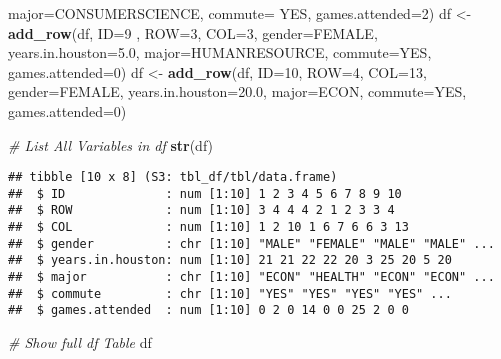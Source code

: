 \documentclass[
]{book}
\newenvironment{Shaded}{\begin{snugshade}}{\end{snugshade}}
\newcommand{\CommentTok}[1]{\textcolor[rgb]{0.56,0.35,0.01}{\textit{#1}}}
\newcommand{\DataTypeTok}[1]{\textcolor[rgb]{0.13,0.29,0.53}{#1}}
\newcommand{\DecValTok}[1]{\textcolor[rgb]{0.00,0.00,0.81}{#1}}
\newcommand{\FloatTok}[1]{\textcolor[rgb]{0.00,0.00,0.81}{#1}}
\newcommand{\KeywordTok}[1]{\textcolor[rgb]{0.13,0.29,0.53}{\textbf{#1}}}
\newcommand{\NormalTok}[1]{#1}
\newcommand{\StringTok}[1]{\textcolor[rgb]{0.31,0.60,0.02}{#1}}
\begin{document}
\begin{Shaded}
\begin{Highlighting}[]
              \DataTypeTok{major=}\StringTok{\textquotesingle{}CONSUMERSCIENCE\textquotesingle{}}\NormalTok{, }\DataTypeTok{commute=} \StringTok{\textquotesingle{}YES\textquotesingle{}}\NormalTok{, }\DataTypeTok{games.attended=}\DecValTok{2}\NormalTok{)}
\NormalTok{df \textless{}{-}}\StringTok{ }\KeywordTok{add\_row}\NormalTok{(df, }\DataTypeTok{ID=}\DecValTok{9}\NormalTok{ , }\DataTypeTok{ROW=}\DecValTok{3}\NormalTok{, }\DataTypeTok{COL=}\DecValTok{3}\NormalTok{,  }\DataTypeTok{gender=}\StringTok{\textquotesingle{}FEMALE\textquotesingle{}}\NormalTok{, }\DataTypeTok{years.in.houston=}\FloatTok{5.0}\NormalTok{,}
              \DataTypeTok{major=}\StringTok{\textquotesingle{}HUMANRESOURCE\textquotesingle{}}\NormalTok{, }\DataTypeTok{commute=}\StringTok{\textquotesingle{}YES\textquotesingle{}}\NormalTok{, }\DataTypeTok{games.attended=}\DecValTok{0}\NormalTok{)}
\NormalTok{df \textless{}{-}}\StringTok{ }\KeywordTok{add\_row}\NormalTok{(df, }\DataTypeTok{ID=}\DecValTok{10}\NormalTok{, }\DataTypeTok{ROW=}\DecValTok{4}\NormalTok{, }\DataTypeTok{COL=}\DecValTok{13}\NormalTok{, }\DataTypeTok{gender=}\StringTok{\textquotesingle{}FEMALE\textquotesingle{}}\NormalTok{, }\DataTypeTok{years.in.houston=}\FloatTok{20.0}\NormalTok{,}
              \DataTypeTok{major=}\StringTok{\textquotesingle{}ECON\textquotesingle{}}\NormalTok{, }\DataTypeTok{commute=}\StringTok{\textquotesingle{}YES\textquotesingle{}}\NormalTok{, }\DataTypeTok{games.attended=}\DecValTok{0}\NormalTok{)}

\CommentTok{\# List All Variables in df}
\KeywordTok{str}\NormalTok{(df)}
\end{Highlighting}
\end{Shaded}

\begin{verbatim}
## tibble [10 x 8] (S3: tbl_df/tbl/data.frame)
##  $ ID              : num [1:10] 1 2 3 4 5 6 7 8 9 10
##  $ ROW             : num [1:10] 3 4 4 4 2 1 2 3 3 4
##  $ COL             : num [1:10] 1 2 10 1 6 7 6 6 3 13
##  $ gender          : chr [1:10] "MALE" "FEMALE" "MALE" "MALE" ...
##  $ years.in.houston: num [1:10] 21 21 22 22 20 3 25 20 5 20
##  $ major           : chr [1:10] "ECON" "HEALTH" "ECON" "ECON" ...
##  $ commute         : chr [1:10] "YES" "YES" "YES" "YES" ...
##  $ games.attended  : num [1:10] 0 2 0 14 0 0 25 2 0 0
\end{verbatim}

\begin{Shaded}
\begin{Highlighting}[]
\CommentTok{\# Show full df Table}
\NormalTok{df}
\end{Highlighting}
\end{Shaded}
\end{document}
